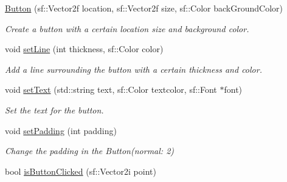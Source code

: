 \begin{DoxyCompactItemize}
\item 
\hypertarget{classty_s_f_m_l_1_1_button_afde520056d437f65a177e4f4fc12ac5d}{}\hyperlink{classty_s_f_m_l_1_1_button_afde520056d437f65a177e4f4fc12ac5d}{Button} (sf\+::\+Vector2f location, sf\+::\+Vector2f size, sf\+::\+Color back\+Ground\+Color)\label{classty_s_f_m_l_1_1_button_afde520056d437f65a177e4f4fc12ac5d}

\begin{DoxyCompactList}\small\item\em Create a button with a certain location size and background color. \end{DoxyCompactList}\item 
\hypertarget{classty_s_f_m_l_1_1_button_a0521b05677da645f022048b89bccdcb2}{}void \hyperlink{classty_s_f_m_l_1_1_button_a0521b05677da645f022048b89bccdcb2}{set\+Line} (int thickness, sf\+::\+Color color)\label{classty_s_f_m_l_1_1_button_a0521b05677da645f022048b89bccdcb2}

\begin{DoxyCompactList}\small\item\em Add a line surrounding the button with a certain thickness and color. \end{DoxyCompactList}\item 
\hypertarget{classty_s_f_m_l_1_1_button_adab9c2d78d4f47ec37f0328615dc5194}{}void \hyperlink{classty_s_f_m_l_1_1_button_adab9c2d78d4f47ec37f0328615dc5194}{set\+Text} (std\+::string text, sf\+::\+Color textcolor, sf\+::\+Font $\ast$font)\label{classty_s_f_m_l_1_1_button_adab9c2d78d4f47ec37f0328615dc5194}

\begin{DoxyCompactList}\small\item\em Set the text for the button. \end{DoxyCompactList}\item 
\hypertarget{classty_s_f_m_l_1_1_button_a3525d3d2f58694d79373aecc27abdea1}{}void \hyperlink{classty_s_f_m_l_1_1_button_a3525d3d2f58694d79373aecc27abdea1}{set\+Padding} (int padding)\label{classty_s_f_m_l_1_1_button_a3525d3d2f58694d79373aecc27abdea1}

\begin{DoxyCompactList}\small\item\em Change the padding in the Button(normal\+: 2) \end{DoxyCompactList}\item 
\hypertarget{classty_s_f_m_l_1_1_button_a1746c80f4bc658702a92d1c1eeb7c126}{}bool \hyperlink{classty_s_f_m_l_1_1_button_a1746c80f4bc658702a92d1c1eeb7c126}{is\+Button\+Clicked} (sf\+::\+Vector2i point)\label{classty_s_f_m_l_1_1_button_a1746c80f4bc658702a92d1c1eeb7c126}


\end{DoxyCompactItemize}
